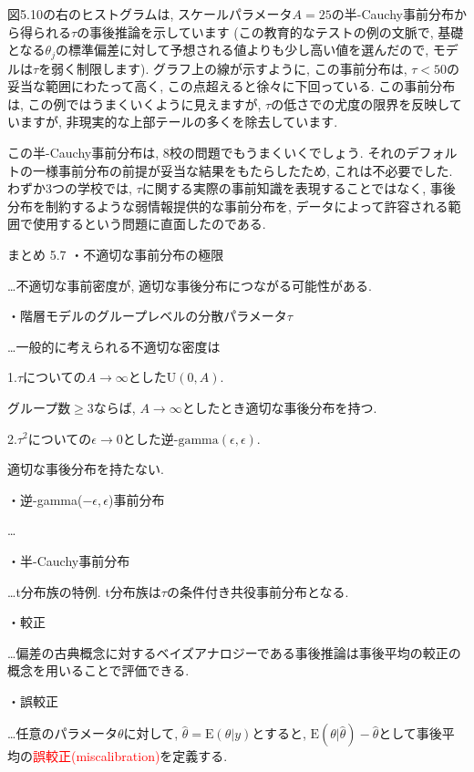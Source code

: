 \documentclass[10pt,dvipdfmx,a4]{beamer}
\newcommand{\tcr}[1]{\textcolor{red}{#1}}
\begin{document}
\begin{frame}
図5.10の右のヒストグラムは, スケールパラメータ$A=25$の半-Cauchy事前分布から得られる$\tau$の事後推論を示しています
(この教育的なテストの例の文脈で, 基礎となる$\theta_j$の標準偏差に対して予想される値よりも少し高い値を選んだので, モデルは$\tau$を弱く制限します).
グラフ上の線が示すように, この事前分布は, $\tau<50$の妥当な範囲にわたって高く, この点超えると徐々に下回っている.
この事前分布は, この例ではうまくいくように見えますが, $\tau$の低さでの尤度の限界を反映していますが, 非現実的な上部テールの多くを除去しています.

この半-Cauchy事前分布は, 8校の問題でもうまくいくでしょう.
それのデフォルトの一様事前分布の前提が妥当な結果をもたらしたため, これは不必要でした.
わずか3つの学校では, $\tau$に関する実際の事前知識を表現することではなく, 事後分布を制約するような弱情報提供的な事前分布を, データによって許容される範囲で使用するという問題に直面したのである.
\end{frame}


\begin{frame}[t]{まとめ 5.7}
・不適切な事前分布の極限

…不適切な事前密度が, 適切な事後分布につながる可能性がある.

・階層モデルのグループレベルの分散パラメータ$\tau$

…一般的に考えられる不適切な密度は

1.$\tau$についての$A\rightarrow \infty$とした$\text{U}(0, A)$.

グループ数$\geq 3$ならば, $A\rightarrow\infty$としたとき適切な事後分布を持つ.

2.$\tau^2$についての$\epsilon\rightarrow 0$とした逆-$\text{gamma}(\epsilon, \epsilon)$.

適切な事後分布を持たない.

・逆-gamma($-\epsilon,\epsilon$)事前分布

…

・半-Cauchy事前分布

…t分布族の特例.
t分布族は$\tau$の条件付き共役事前分布となる.

・較正

…偏差の古典概念に対するベイズアナロジーである事後推論は事後平均の較正の概念を用いることで評価できる.

・誤較正

…任意のパラメータ$\theta$に対して, $\hat{\theta}=\text{E}(\theta|y)$とすると, $\text{E}(\theta|\hat{\theta})-\hat{\theta}$として事後平均の\tcr{誤較正(miscalibration)}を定義する.
\end{frame}

\end{document}
